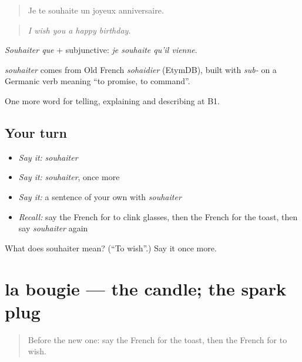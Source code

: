 \begin{quote}
Je te souhaite un joyeux anniversaire.
\end{quote}

\begin{quote}
\emph{I wish you a happy birthday.}
\end{quote}

\emph{Souhaiter que} + subjunctive: \emph{je souhaite qu'il vienne}.

\begin{cousinweb}
\emph{souhaiter} comes from Old French \emph{sohaidier} (EtymDB), built with \emph{sub-} on a Germanic verb meaning \textquotedblleft{}to promise, to command\textquotedblright{}.
\end{cousinweb}

\begin{grammarlens}[title={What you've built}]
One more word for telling, explaining and describing at B1.
\end{grammarlens}

\subsection*{Your turn}
\begin{itemize}
\raggedright
  \item \emph{Say it:} \emph{souhaiter}
  \item \emph{Say it:} \emph{souhaiter}, once more
  \item \emph{Say it:} a sentence of your own with \emph{souhaiter}
  \item \emph{Recall:} say the French for to clink glasses, then the French for the toast, then say \emph{souhaiter} again
\end{itemize}

\begin{tcolorbox}[breakable,colback=teal!4,colframe=teal!35!black,title={Before you move on}]
What does souhaiter mean? (\textquotedblleft{}To wish\textquotedblright{}.) Say it once more.
\end{tcolorbox}
\section[la bougie]{la bougie — the candle; the spark plug}

\label{lesson:FR-C320-bougie}



\begin{quote}
Before the new one: say the French for the toast, then the French for to wish.
\end{quote}

